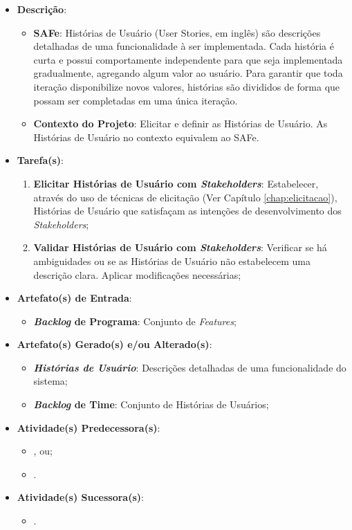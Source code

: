				\begin{itemize}
					\item{\textbf{Descrição}:
						\begin{itemize}
							\item{\textbf{SAFe}: Histórias de Usuário (User Stories, em inglês) são descrições detalhadas de uma funcionalidade à ser implementada. Cada história é curta e possui comportamente independente para que seja implementada gradualmente, agregando algum valor ao usuário. Para garantir que toda iteração disponibilize novos valores, histórias são divididos de forma que possam ser completadas em uma única iteração.}
							\item{\textbf{Contexto do Projeto}: Elicitar e definir as Histórias de Usuário. As Histórias de Usuário no contexto equivalem ao SAFe.}
						\end{itemize}}
					\item{\textbf{Tarefa(s)}:
						\begin{enumerate}
							\item{\textbf{Elicitar Histórias de Usuário com \emph{Stakeholders}}: Estabelecer, através do uso de técnicas de elicitação (Ver Capítulo \ref{chap:elicitacao}), Histórias de Usuário que satisfaçam as intenções de desenvolvimento dos \emph{Stakeholders};}
							\item{\textbf{Validar Histórias de Usuário com \emph{Stakeholders}}: Verificar se há ambiguidades ou se as Histórias de Usuário não estabelecem uma descrição clara. Aplicar modificações necessárias;}
						\end{enumerate}}
					\item{\textbf{Artefato(s) de Entrada}:
						\begin{itemize}
							\item{\textbf{\emph{Backlog} de Programa}: Conjunto de \emph{Features};}
						\end{itemize}}
					\item{\textbf{Artefato(s) Gerado(s) e/ou Alterado(s)}:
						\begin{itemize}
							\item{\textbf{\emph{Histórias de Usuário}}: Descrições detalhadas de uma funcionalidade do sistema;}
							\item{\textbf{\emph{Backlog} de Time}: Conjunto de Histórias de Usuários;}
						\end{itemize}}
					\item{\textbf{Atividade(s) Predecessora(s)}:
						\begin{itemize}
							\item{, ou;}
							\item{.}
						\end{itemize}}
					\item{\textbf{Atividade(s) Sucessora(s)}:
						\begin{itemize}
							\item{.}
						\end{itemize}}
				\end{itemize}

